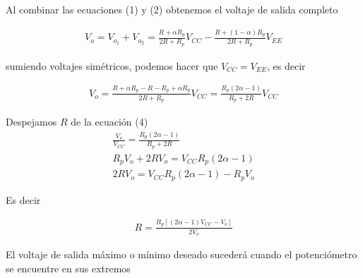 \documentclass{article}
\begin{document}
Al combinar las ecuaciones (1) y (2) obtenemos el voltaje de salida completo

\begin{align}
	V_o = V_{o_1} + V_{o_2} = \frac{R + \alpha R_p}{2R + R_p}V_{CC} - \frac{R + (1 - \alpha) R_p}{2R + R_p}V_{EE}
\end{align}

sumiendo voltajes simétricos, podemos hacer que $V_{CC} = V_{EE}$, es decir

\begin{align}
	V_o = \frac{R + \alpha R_p - R - R_p + \alpha R_p}{2R + R_p} V_{CC} = \frac{R_p (2\alpha -1 )}{R_p + 2R} V_{CC}
\end{align}

Despejamos $R$ de la ecuación (4)
\begin{align}
	\frac{V_o}{V_{CC}} = \frac{R_p (2\alpha -1 )}{R_p + 2R} \nonumber \\
	R_p V_o + 2RV_o = V_{CC}R_p(2\alpha -1) \nonumber \\
	2RV_o = V_{CC}R_p(2\alpha -1) - R_p V_o
\end{align}

Es decir

\begin{align}
	R = \frac{R_p \left[ (2\alpha - 1)V_{CC} - V_o \right]}{2V_o}
\end{align}

El voltaje de salida máximo o mínimo deseado sucederá cuando el potenciómetro se encuentre en sus extremos
\end{document}
